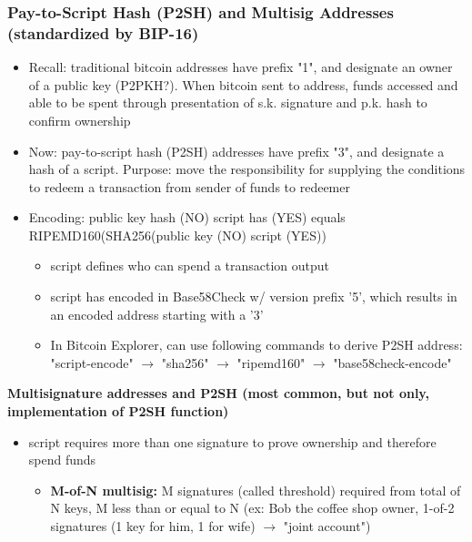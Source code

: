 \documentclass[english, 11pt]{article}
\begin{document}
\subsubsection{Pay-to-Script Hash (P2SH) and Multisig Addresses (standardized by BIP-16)}
\begin{itemize}
    \item Recall: traditional bitcoin addresses have prefix "1", and designate an owner of a public key (P2PKH?). When bitcoin sent to address, funds accessed and able to be spent through presentation of s.k. signature and p.k. hash to confirm ownership
    \item Now: pay-to-script hash (P2SH) addresses have prefix "3", and designate a hash of a script. Purpose: move the responsibility for supplying the conditions to redeem a transaction from sender of funds to redeemer 
    \item Encoding: public key hash (NO) script has (YES) equals RIPEMD160(SHA256(public key (NO) script (YES))
    \begin{itemize}
        \item script defines who can spend a transaction output
        \item script has encoded in Base58Check w/ version prefix '5', which results in an encoded address starting with a '3'
        \item In Bitcoin Explorer, can use following commands to derive P2SH address: "script-encode" $\rightarrow$ "sha256" $\rightarrow$ "ripemd160" $\rightarrow$ "base58check-encode"
    \end{itemize}
\end{itemize}
\textbf{Multisignature addresses and P2SH (most common, but not only, implementation of P2SH function)}
\begin{itemize}
    \item script requires more than one signature to prove ownership and therefore spend funds
    \begin{itemize}
        \item \textbf{M-of-N multisig:} M signatures (called threshold) required from total of N keys, M less than or equal to N (ex: Bob the coffee shop owner, 1-of-2 signatures (1 key for him, 1 for wife) $\rightarrow$ "joint account")
    \end{itemize}
\end{itemize}
\clearpage


\end{document}
